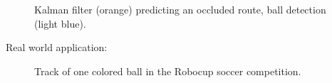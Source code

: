 \documentclass{sciposter}
\begin{document}
\begin{multicols}{3}
\begin{figure}[!h]
	\centering
			\setlength{\fboxsep}{1pt}
			\setlength{\fboxrule}{1pt}
	\caption{Kalman filter (orange) predicting an occluded route, ball detection (light blue).}
	\label{fig:occlusion}
\end{figure}

Real world application:

\begin{figure}[!h]
	\centering
			\setlength{\fboxsep}{1pt}
			\setlength{\fboxrule}{1pt}
	\caption{Track of one colored ball in the Robocup soccer competition.}
	\label{fig:robocup_1}
\end{figure}


\end{multicols}
\end{document}
